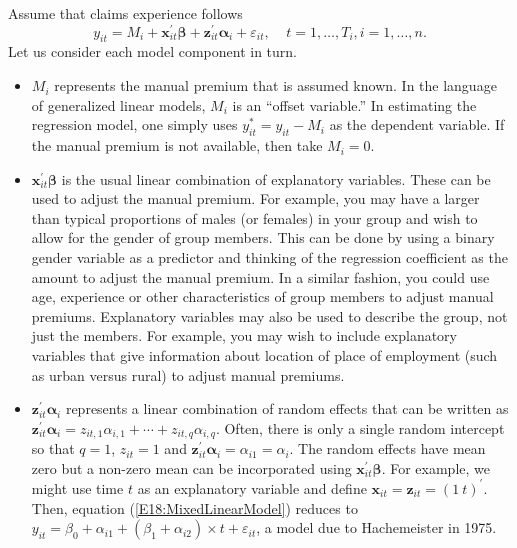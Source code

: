 Assume that claims experience follows
\begin{equation}\label{E18:MixedLinearModel}
y_{it} = M_i + \mathbf{x}_{it}^{\prime} \boldsymbol \beta+
\mathbf{z}_{it}^{\prime} {\boldsymbol \alpha}_i +
\varepsilon_{it},~~~~~ t=1, \ldots, T_i, i=1,\ldots, n.
\end{equation}
Let us consider each model component in turn.
\begin{itemize}


\item $M_i$ represents the manual premium that is assumed known.
In the language of generalized linear models, $M_i$ is an ``offset
variable.'' In estimating the regression model, one simply uses
$y_{it}^{\ast} = y_{it} - M_i$ as the dependent variable. If the
manual premium is not available, then take $M_i = 0$.


\item $\mathbf{x}_{it}^{\prime} \boldsymbol \beta$ is the usual
linear combination of explanatory variables. These can be used to
adjust the manual premium. For example, you may have a larger than
typical proportions of males (or females) in your group and wish to
allow for the gender of group members. This can be done by using a
binary gender variable as a predictor and thinking of the regression
coefficient as the amount to adjust the manual premium. In a similar
fashion, you could use age, experience or other characteristics of
group members to adjust manual premiums. Explanatory variables may
also be used to describe the group, not just the members. For
example, you may wish to include explanatory variables that give
information about location of place of employment (such as urban
versus rural) to adjust manual premiums.

\item $\mathbf{z}_{it}^{\prime} {\boldsymbol \alpha}_i$ represents a
linear combination of random effects that can be written as
$\mathbf{z}_{it}^{\prime} {\boldsymbol \alpha}_i = z_{it,1}
\alpha_{i,1} + \cdots +z_{it,q} \alpha_{i,q}$. Often, there is only
a single random intercept so that $q=1$, $z_{it}=1$ and
$\mathbf{z}_{it}^{\prime} {\boldsymbol \alpha}_i = \alpha_{i1} =
\alpha_i$. The random effects have mean zero but a non-zero mean can
be incorporated using $\mathbf{x}_{it}^{\prime} \boldsymbol \beta$.
For example, we might use time $t$ as an explanatory variable and
define $\mathbf{x}_{it}=\mathbf{z}_{it}=(1 ~t)^{\prime}$. Then,
equation (\ref{E18:MixedLinearModel}) reduces to $y_{it} = \beta_0 +
\alpha_{i1} + ( \beta_1 + \alpha_{i2}) \times t+ \varepsilon_{it}$,
a model due to Hachemeister in 1975.


\end{itemize}
